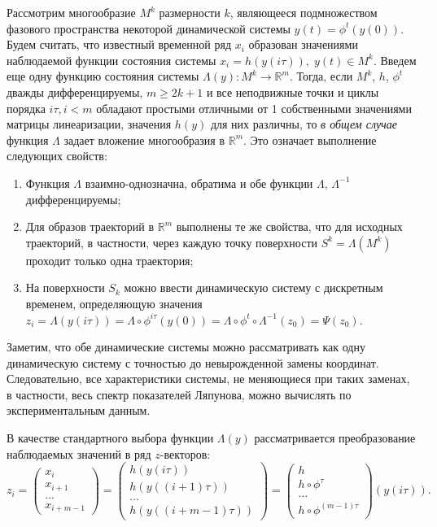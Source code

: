 
\begin{theorem}
    Рассмотрим многообразие $M^k$ размерности $k$, являющееся подмножеством фазового пространства некоторой динамической системы $y(t) = \phi^t(y(0))$.
    Будем считать, что известный временной ряд $x_i$ образован значениями наблюдаемой функции состояния системы $x_i = h(y(i\tau)),\; y(t) \in M^k$.
    Введем еще одну функцию состояния системы $\Lambda(y): M^k \to \mathbb{R}^{m}$.
    Тогда, если $M^k$, $h$, $\phi^t$ дважды дифференцируемы, $m \geq 2k+1$ и все неподвижные точки и циклы порядка $i\tau, i < m$ обладают простыми отличными от 1 собственными значениями матрицы линеаризации, значения $h(y)$ для них различны, то \emph{в общем случае} функция $\Lambda$ задает вложение многообразия в $\mathbb{R}^{m}$.
    Это означает выполнение следующих свойств:
    \begin{enumerate}
    \item
        Функция $\Lambda$ взаимно-однозначна, обратима и обе функции $\Lambda$, $\Lambda^{-1}$ дифференцируемы;
    \item
        Для образов траекторий в $\mathbb{R}^m$ выполнены те же свойства, что для исходных траекторий, в частности, через каждую точку поверхности $S^k = \Lambda(M^k)$ проходит только одна траектория;
    \item
        На поверхности $S_k$ можно ввести динамическую систему с дискретным временем, определяющую значения $z_i = \Lambda(y(i\tau)) = \Lambda \circ \phi^{i\tau} (y(0)) = \Lambda \circ \phi^t \circ \Lambda^{-1} \left( z_0 \right) = \Psi\left( z_0 \right)$.
    \end{enumerate}
\end{theorem}

Заметим, что обе динамические системы можно рассматривать как одну динамическую систему с точностью до невырожденной замены координат.
Следовательно, все характеристики системы, не меняющиеся при таких заменах, в частности, весь спектр показателей Ляпунова, можно вычислять по экспериментальным данным.

В качестве стандартного выбора функции $\Lambda(y)$ рассматривается преобразование наблюдаемых значений в ряд $z$-векторов:
\begin{equation*}
    z_i =
    \begin{pmatrix} x_i \\ x_{i+1} \\ \dots \\ x_{i+m-1} \end{pmatrix} =
    \begin{pmatrix} h(y(i\tau)) \\ h(y((i+1)\tau)) \\ \dots \\ h(y((i+m-1)\tau)) \end{pmatrix} =
    \begin{pmatrix} h \\ h \circ \phi^\tau \\ \dots \\ h \circ \phi^{(m-1)\tau} \end{pmatrix} \left( y(i\tau) \right).
\end{equation*}

